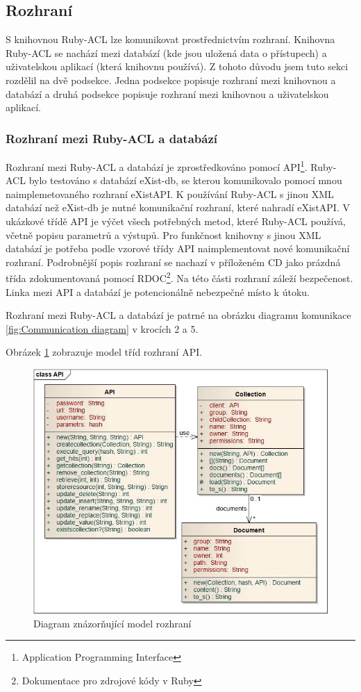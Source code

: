 
\subsection{Rozhraní}
S knihovnou Ruby-ACL lze komunikovat prostřednictvím rozhraní. Knihovna Ruby-ACL se nachází mezi databází (kde jsou uložená data o přístupech) a uživatelskou aplikací (která knihovnu používá). Z tohoto důvodu jsem tuto sekci rozdělil na dvě podsekce. Jedna podsekce popisuje rozhraní mezi knihovnou a databází a druhá podsekce popisuje rozhraní mezi knihovnou a uživatelskou aplikací. 


\subsubsection{Rozhraní mezi Ruby-ACL a databází}
Rozhraní mezi Ruby-ACL a databází je zprostředkováno pomocí API\footnote{Application Programming Interface}.
Ruby-ACL bylo testováno s databází eXist-db, se kterou komunikovalo pomocí mnou naimplemetovaného rozhraní eXistAPI. 
K používání Ruby-ACL s jinou XML databází než eXist-db je nutné komunikační rozhraní, které nahradí eXistAPI.
V ukázkové třídě API je výčet všech potřebných metod, které Ruby-ACL používá, včetně popisu parametrů a výstupů. Pro funkčnost knihovny s jinou XML databází je potřeba podle vzorové třídy API naimplementovat nové komunikační rozhraní. 
Podrobnější popis rozhraní se nachazí v příloženém CD jako prázdná třída zdokumentovaná pomocí RDOC\footnote{Dokumentace pro zdrojové kódy v Ruby}. Na této části rozhraní záleží bezpečenost. Linka mezi API a databází je potencionálně nebezpečné místo k útoku.

\noindent Rozhraní mezi Ruby-ACL a databází je patrné na obrázku diagramu komunikace \ref{fig:Communication diagram} v krocích 2 a 5.

\noindent Obrázek \ref{fig:API_interface} zobrazuje model tříd rozhraní API.

\begin{figure}
\includegraphics[width=15cm]{API1.jpg}
\caption{Diagram znázorňující model rozhraní}
\label{fig:API_interface}
\end{figure}

